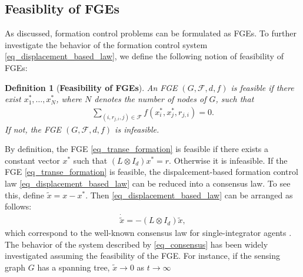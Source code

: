 \documentclass{ifacconf}
\newtheorem{definition}{Definition}[section]
\begin{document}


\subsection{Feasiblity of FGEs}
 As discussed, formation control problems can be formulated as FGEs. To further investigate the behavior of the formation control system \eqref{eq_displacement_based_law}, we define the following notion of feasibility of FGEs:
 \begin{definition} [\textbf{Feasibility of FGEs}]
An FGE $(G,\mathcal{F},d,f)$ is feasible if there exist $x_1^*,\ldots,x_N^*$, where $N$ denotes the number of nodes of $G$, such that 
\begin{align*}
\sum_{(i,r_{j,i},j) \in \mathcal{F}}f(x^*_i,x_j^*,r_{j,i}) = 0.
\end{align*}
If not, the FGE $(G,\mathcal{F},d,f)$ is infeasible.
 \end{definition}

By definition, the FGE \eqref{eq_transe_formation} is feasible if there exists a constant vector $x^*$ such that $(L \otimes I_d)x^* = r$. Otherwise it is infeasible. If the FGE \eqref{eq_transe_formation} is feasible, the dispalcement-based formation control law \eqref{eq_displacement_based_law} can be reduced into a consensus law. To see this, define $\tilde{x} = x - x^*$. Then \eqref{eq_displacement_based_law} can be arranged as follows:
 \begin{align} \label{eq_consensus}
 \dot{\tilde{x}} = - (L \otimes I_d) \tilde{x},
 \end{align}
 which correspond to the well-known consensus law for single-integrator agents \cite{olfati-saber2004consensus,ren2005consensus,lin2007state,dimarogonas2008connection,oh2015survey}. The behavior of the system described by \eqref{eq_consensus} has been widely investigated \cite{olfati-saber2004consensus,ren2005consensus,lin2007state,oh2015survey} assuming the feasibility of the FGE. For instance, if the sensing graph $G$ has a spanning tree, $\tilde{x} \to 0$ as $t \to \infty$
\end{document}
